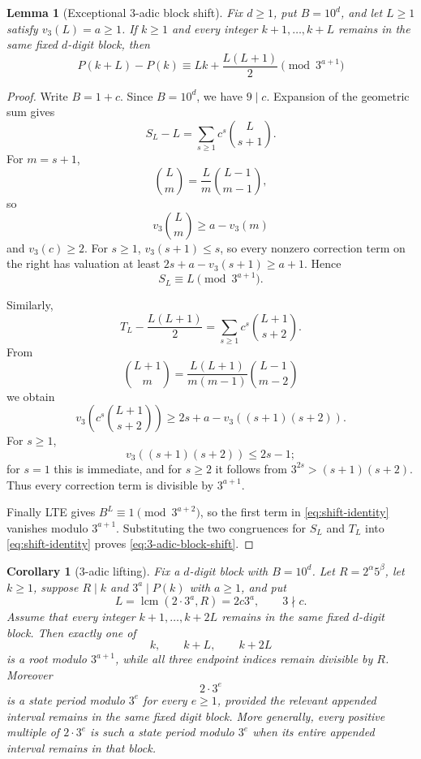 \documentclass[11pt]{amsart}
\newtheorem{lemma}[theorem]{Lemma}
\newtheorem{corollary}[theorem]{Corollary}
\theoremstyle{remark}
\begin{document}
\begin{lemma}[Exceptional \(3\)-adic block shift]\label{lem:3-adic-shift}
Fix \(d\ge1\), put \(B=10^d\), and let \(L\ge1\) satisfy \(v_3(L)=a\ge1\).
If \(k\ge1\) and every integer \(k+1,\ldots,k+L\) remains in the same fixed
\(d\)-digit block, then
\begin{equation}\label{eq:3-adic-block-shift}
P(k+L)-P(k)
\equiv Lk+\frac{L(L+1)}2
\pmod{3^{a+1}}
\end{equation}
\end{lemma}

\begin{proof}
Write \(B=1+c\).  Since \(B=10^d\), we have \(9\mid c\).  Expansion of the geometric
sum gives
\[
S_L-L=\sum_{s\ge1}c^s\binom{L}{s+1}.
\]
For \(m=s+1\),
\[
\binom{L}{m}=\frac{L}{m}\binom{L-1}{m-1},
\]
so
\[
v_3\binom{L}{m}\ge a-v_3(m)
\]
and \(v_3(c)\ge2\).  For \(s\ge1\), \(v_3(s+1)\le s\), so every nonzero
correction term on the right has valuation at least
\(2s+a-v_3(s+1)\ge a+1\).  Hence
\[
S_L\equiv L\pmod{3^{a+1}}.
\]

Similarly,
\[
T_L-\frac{L(L+1)}2
 =\sum_{s\ge1}c^s\binom{L+1}{s+2}.
\]
From
\[
\binom{L+1}{m}
 =\frac{L(L+1)}{m(m-1)}\binom{L-1}{m-2}
\]
we obtain
\[
v_3\!\left(c^s\binom{L+1}{s+2}\right)
 \ge 2s+a-v_3((s+1)(s+2)).
\]
For \(s\ge1\),
\[
v_3((s+1)(s+2))\le 2s-1;
\]
for \(s=1\) this is immediate, and for \(s\ge2\) it follows from
\(3^{2s}>(s+1)(s+2)\).  Thus every correction term is divisible by \(3^{a+1}\).

Finally LTE gives \(B^L\equiv1\pmod{3^{a+2}}\), so the first term in
\eqref{eq:shift-identity} vanishes modulo \(3^{a+1}\).  Substituting the two congruences for
\(S_L\) and \(T_L\) into \eqref{eq:shift-identity} proves \eqref{eq:3-adic-block-shift}.
\end{proof}

\begin{corollary}[\(3\)-adic lifting]\label{cor:3-adic-lifting}
Fix a \(d\)-digit block with \(B=10^d\).  Let \(R=2^\alpha5^\beta\), let \(k\ge1\),
suppose \(R\mid k\) and \(3^a\mid P(k)\) with \(a\ge1\), and put
\begin{equation}\label{eq:3-adic-step}
L=\operatorname{lcm}(2\cdot3^a,R)=2c3^a,
\qquad 3\nmid c.
\end{equation}
Assume that every integer \(k+1,\ldots,k+2L\) remains in the same fixed \(d\)-digit
block.  Then exactly one of
\[
k,\qquad k+L,\qquad k+2L
\]
is a root modulo \(3^{a+1}\), while all three endpoint indices remain divisible by \(R\).
Moreover
\begin{equation}\label{eq:3-adic-period}
2\cdot3^e
\end{equation}
is a state period modulo \(3^e\) for every \(e\ge1\), provided the relevant appended
interval remains in the same fixed digit block.  More generally, every positive multiple
of \(2\cdot3^e\) is such a state period modulo \(3^e\) when its entire appended interval
remains in that block.
\end{corollary}
\end{document}
